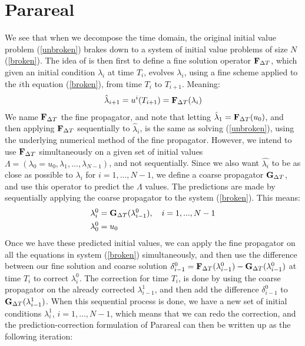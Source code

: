 \section{Parareal}\label{Parareal_sec}
We see that when we decompose the time domain, the original initial value problem (\ref{unbroken}) brakes down to a system of initial value problems of size $N$ (\ref{broken}). The idea of \cite{baffico2002parallel} is then first to define a fine solution operator $\bold F_{\Delta T}$, which given an initial condition $\lambda_i$ at time $T_i$, evolves $\lambda_i$, using a fine scheme applied to the $i$th equation (\ref{broken}), from time $T_i$ to $T_{i+1}$. Meaning:
\begin{align*}
\hat \lambda_{i+1}= u^i(T_{i+1})=\bold F_{\Delta T}(\lambda_i)
\end{align*} 
We name $\bold F_{\Delta T}$ the fine propagator, and note that letting $\hat \lambda_{1}=\bold F_{\Delta T}(u_0)$, and then applying $\bold F_{\Delta T}$ sequentially to $\hat \lambda_{i}$, is the same as solving (\ref{unbroken}), using the underlying numerical method of the fine propagator. However, we intend to use $\bold F_{\Delta T}$ simultaneously on a given set of initial values $\Lambda=(\lambda_0=u_0,\lambda_1,...,\lambda_{N-1})$, and not sequentially. Since we also want $\hat{\lambda_i}$ to be as close as possible to $\lambda_i$ for $i=1,...,N-1$, we define a coarse propagator $\bold G_{\Delta T}$, and use this operator to predict the $\Lambda$ values. The predictions are made by sequentially applying the coarse propagator to the system (\ref{broken}). This means:
\begin{align}
\lambda_i^0 &= \bold G_{\Delta T}(\lambda_{i-1}^0),\quad i=1,...,N-1 \\
\lambda_0^0&=u_0
\end{align} 
Once we have these predicted initial values, we can apply the fine propagator on all the equations in system (\ref{broken}) simultaneously, and then use the difference between our fine solution  and coarse solution $\delta_{i-1}^0= \bold F_ {\Delta T}( \lambda_{i-1}^0)-\bold G_ {\Delta T}( \lambda_{i-1}^0)$ at time $T_i$ to correct $\lambda_i^0$. The correction for time $T_i$, is done by using the coarse propagator on the already corrected $\lambda_{i-1}^1$, and then add the difference $\delta_{i-1}^0$ to $\bold G_ {\Delta T}(\lambda_{i-1}^1)$. When this sequential process is done, we have a new set of initial conditions $\lambda_i^1$, $i=1,...,N-1$, which means that we can redo the correction, and the prediction-correction formulation of Parareal can then be written up as the following iteration:
